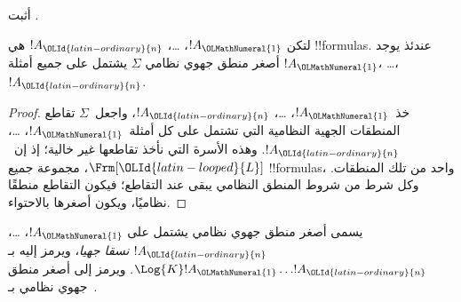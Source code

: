 \documentclass[../../../include/open-logic-section]{subfiles}
\begin{document}
\begin{prob}
  أثبت .
\end{prob}

\begin{prop}
  لتكن $!A_\OLMathNumeral{1}$، \dots، $!A_\OLId{latin-ordinary}{n}$ هي !!{formula}s. عندئذ يوجد أصغر
  منطق جهوي نظامي $\Sigma$ يشتمل على جميع أمثلة $!A_\OLMathNumeral{1}$، \dots، $!A_\OLId{latin-ordinary}{n}$.
\end{prop}

\begin{proof}
  خذ~$!A_\OLMathNumeral{1}$، \dots، $!A_\OLId{latin-ordinary}{n}$، واجعل~$\Sigma$ تقاطع المنطقات
  الجهية النظامية التي تشتمل على كل أمثلة~$!A_\OLMathNumeral{1}$، \dots، $!A_\OLId{latin-ordinary}{n}$.
  وهذه الأسرة التي نأخذ تقاطعها غير خالية؛ إذ إن~$\Frm[\OLId{latin-looped}{L}]$،
  مجموعة جميع !!{formula}s، واحد من تلك المنطقات.
  وكل شرط من شروط المنطق النظامي يبقى عند التقاطع؛ فيكون التقاطع
  منطقًا نظاميًا، ويكون أصغرها بالاحتواء.
\end{proof}

\begin{defn}
يسمى أصغر منطق جهوي نظامي يشتمل على $!A_\OLMathNumeral{1}$، \dots، $!A_\OLId{latin-ordinary}{n}$
\emph{نسقا جهيا}، ويرمز إليه بـ$\Log{K} !A_\OLMathNumeral{1} \dots
!A_\OLId{latin-ordinary}{n}$. ويرمز إلى أصغر منطق جهوي نظامي بـ~.
\end{defn}
\end{document}
